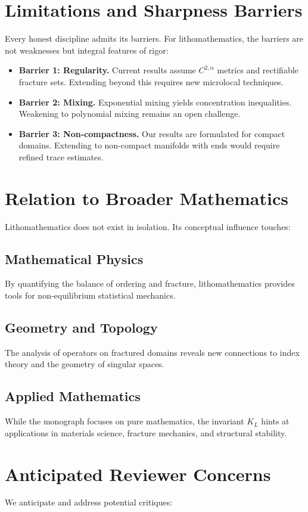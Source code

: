 \section*{Limitations and Sharpness Barriers}
Every honest discipline admits its barriers. For lithomathematics, the barriers are not weaknesses but integral features of rigor:

\begin{itemize}
\item \textbf{Barrier 1: Regularity.} Current results assume $C^{2,\alpha}$ metrics and rectifiable fracture sets. Extending beyond this requires new microlocal techniques.
\item \textbf{Barrier 2: Mixing.} Exponential mixing yields concentration inequalities. Weakening to polynomial mixing remains an open challenge.
\item \textbf{Barrier 3: Non-compactness.} Our results are formulated for compact domains. Extending to non-compact manifolds with ends would require refined trace estimates.
\end{itemize}

\section*{Relation to Broader Mathematics}
Lithomathematics does not exist in isolation. Its conceptual influence touches:

\subsection*{Mathematical Physics}
By quantifying the balance of ordering and fracture, lithomathematics provides tools for non-equilibrium statistical mechanics.

\subsection*{Geometry and Topology}
The analysis of operators on fractured domains reveals new connections to index theory and the geometry of singular spaces.

\subsection*{Applied Mathematics}
While the monograph focuses on pure mathematics, the invariant $K_L$ hints at applications in materials science, fracture mechanics, and structural stability.

\section*{Anticipated Reviewer Concerns}
We anticipate and address potential critiques:

